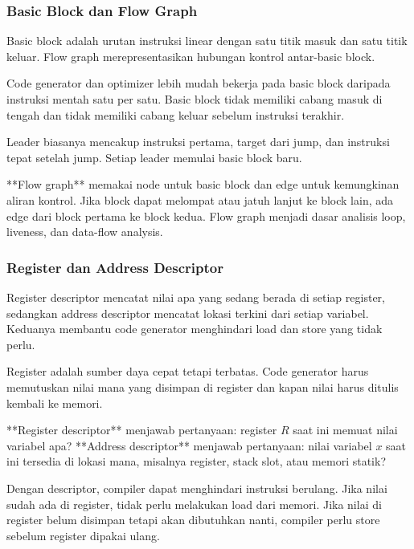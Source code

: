 \subsubsection{Basic Block dan Flow Graph}

\begin{jawab}
Basic block adalah urutan instruksi linear dengan satu titik masuk dan satu titik keluar. Flow graph merepresentasikan hubungan kontrol antar-basic block.
\end{jawab}

Code generator dan optimizer lebih mudah bekerja pada basic block daripada instruksi mentah satu per satu. Basic block tidak memiliki cabang masuk di tengah dan tidak memiliki cabang keluar sebelum instruksi terakhir.

Leader biasanya mencakup instruksi pertama, target dari jump, dan instruksi tepat setelah jump. Setiap leader memulai basic block baru.

**Flow graph** memakai node untuk basic block dan edge untuk kemungkinan aliran kontrol. Jika block dapat melompat atau jatuh lanjut ke block lain, ada edge dari block pertama ke block kedua. Flow graph menjadi dasar analisis loop, liveness, dan data-flow analysis.

\subsubsection{Register dan Address Descriptor}

\begin{jawab}
Register descriptor mencatat nilai apa yang sedang berada di setiap register, sedangkan address descriptor mencatat lokasi terkini dari setiap variabel. Keduanya membantu code generator menghindari load dan store yang tidak perlu.
\end{jawab}

Register adalah sumber daya cepat tetapi terbatas. Code generator harus memutuskan nilai mana yang disimpan di register dan kapan nilai harus ditulis kembali ke memori.

**Register descriptor** menjawab pertanyaan: register $R$ saat ini memuat nilai variabel apa? **Address descriptor** menjawab pertanyaan: nilai variabel $x$ saat ini tersedia di lokasi mana, misalnya register, stack slot, atau memori statik?

Dengan descriptor, compiler dapat menghindari instruksi berulang. Jika nilai sudah ada di register, tidak perlu melakukan load dari memori. Jika nilai di register belum disimpan tetapi akan dibutuhkan nanti, compiler perlu store sebelum register dipakai ulang.

